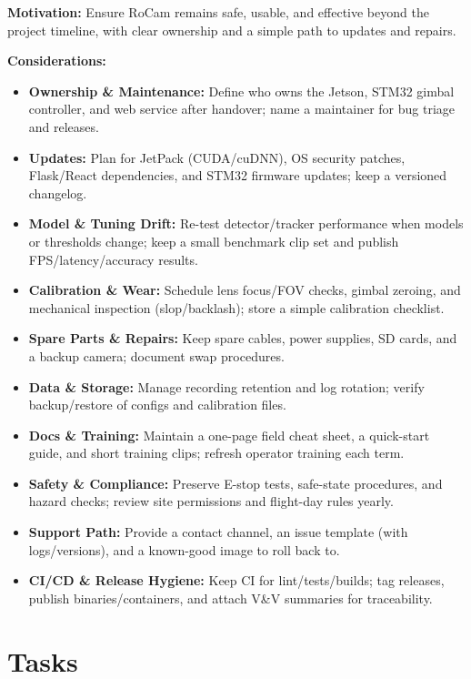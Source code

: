 \documentclass[12pt]{article}
\begin{document}
\textbf{Motivation:} Ensure RoCam remains safe, usable, and effective beyond the project timeline, with clear ownership and a simple path to updates and repairs.

\textbf{Considerations:}
\begin{itemize}
  \item \textbf{Ownership \& Maintenance:} Define who owns the Jetson, STM32 gimbal controller, and web service after handover; name a maintainer for bug triage and releases.
  \item \textbf{Updates:} Plan for JetPack (CUDA/cuDNN), OS security patches, Flask/React dependencies, and STM32 firmware updates; keep a versioned changelog.
  \item \textbf{Model \& Tuning Drift:} Re-test detector/tracker performance when models or thresholds change; keep a small benchmark clip set and publish FPS/latency/accuracy results.
  \item \textbf{Calibration \& Wear:} Schedule lens focus/FOV checks, gimbal zeroing, and mechanical inspection (slop/backlash); store a simple calibration checklist.
  \item \textbf{Spare Parts \& Repairs:} Keep spare cables, power supplies, SD cards, and a backup camera; document swap procedures.
  \item \textbf{Data \& Storage:} Manage recording retention and log rotation; verify backup/restore of configs and calibration files.
  \item \textbf{Docs \& Training:} Maintain a one-page field cheat sheet, a quick-start guide, and short training clips; refresh operator training each term.
  \item \textbf{Safety \& Compliance:} Preserve E-stop tests, safe-state procedures, and hazard checks; review site permissions and flight-day rules yearly.
  \item \textbf{Support Path:} Provide a contact channel, an issue template (with logs/versions), and a known-good image to roll back to.
  \item \textbf{CI/CD \& Release Hygiene:} Keep CI for lint/tests/builds; tag releases, publish binaries/containers, and attach V\&V summaries for traceability.
\end{itemize}




\section{Tasks}
\end{document}
